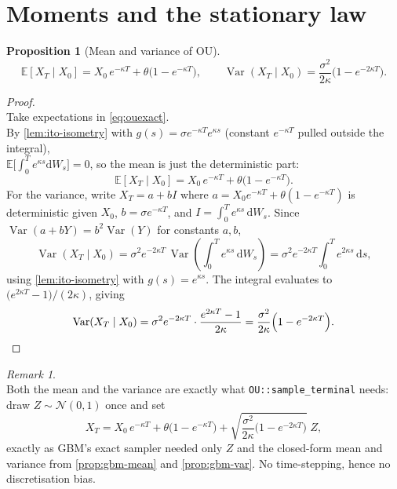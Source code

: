 \documentclass[11pt]{report}
\newcommand{\E}{\mathbb{E}}
\newcommand{\Var}{\operatorname{Var}}
\newcommand{\dd}{\mathrm{d}}
\theoremstyle{plain}
\newtheorem{proposition}{Proposition}[chapter]
\theoremstyle{definition}
\theoremstyle{remark}
\newtheorem{remark}{Remark}[chapter]
\numberwithin{equation}{chapter}
\begin{document}
\section{Moments and the stationary law}

\begin{proposition}[Mean and variance of OU]\label{prop:ou-moments}
\[
   \E[X_T\mid X_0] = X_0\,e^{-\kappa T} + \theta\big(1-e^{-\kappa T}\big),
   \qquad
   \Var(X_T\mid X_0) = \frac{\sigma^2}{2\kappa}\Big(1-e^{-2\kappa T}\Big).
\]
\end{proposition}

\begin{proof}
  \leavevmode\\
Take expectations in \eqref{eq:ouexact}.
\\By \cref{lem:ito-isometry}
with $g(s)=\sigma e^{-\kappa T}e^{\kappa s}$ (constant $e^{-\kappa T}$
pulled outside the integral),
\\$\E\big[\int_0^T e^{\kappa
s}\dd W_s\big]=0$, so the mean is just the deterministic part:
\[
   \E[X_T\mid X_0] = X_0\,e^{-\kappa T} + \theta\big(1-e^{-\kappa T}\big).
\]
For the variance, write $X_T = a + bI$ where
$a=X_0e^{-\kappa T}+\theta(1-e^{-\kappa T})$ is deterministic given
$X_0$, $b=\sigma e^{-\kappa T}$, and $I=\int_0^T e^{\kappa s}\,\dd
W_s$. Since $\Var(a+bY)=b^2\Var(Y)$ for constants $a,b$,
\[
   \Var(X_T\mid X_0)
     = \sigma^2 e^{-2\kappa T}\,\Var\!\left(\int_0^T e^{\kappa s}\,\dd W_s\right)
     = \sigma^2 e^{-2\kappa T}\int_0^T e^{2\kappa s}\,\dd s ,
\]
using \cref{lem:ito-isometry} with $g(s)=e^{\kappa s}$. The integral
evaluates to $\big(e^{2\kappa T}-1\big)/(2\kappa)$, giving
\[
   \Var(X_T\mid X_0)
     = \sigma^2 e^{-2\kappa T}\cdot\frac{e^{2\kappa T}-1}{2\kappa}
     = \frac{\sigma^2}{2\kappa}\Big(1-e^{-2\kappa T}\Big). \qedhere
\]
\end{proof}

\begin{remark}
  \leavevmode\\
Both the mean and the variance are exactly what
\texttt{OU::sample\_terminal} needs: 
\\ draw $Z\sim\mathcal N(0,1)$ once
and set
\[
   X_T = X_0\,e^{-\kappa T} + \theta\big(1-e^{-\kappa T}\big)
         + \sqrt{\frac{\sigma^2}{2\kappa}\big(1-e^{-2\kappa T}\big)}\;Z,
\]
exactly as GBM's exact sampler needed only $Z$ and the closed-form mean
and variance from \cref{prop:gbm-mean} and \cref{prop:gbm-var}. No time-stepping, hence no
discretisation bias.
\end{remark}
\end{document}
